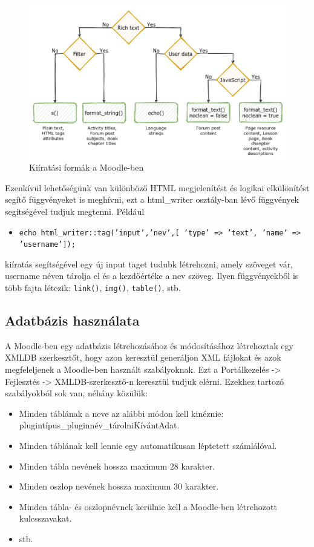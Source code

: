 \begin{figure}
    \centering
    \includegraphics[scale=0.9]{Fejezetek/Images/print.png}
    \caption{Kiíratási formák a Moodle-ben}
\end{figure}

Ezenkívül lehetőségünk van különböző HTML megjelenítést és logikai elkülönítést segítő függvényeket is meghívni, ezt a html\_writer osztály-ban lévő függvények segítségével tudjuk megtenni. Például
\begin{itemize}
    \item[] \texttt{echo html\_writer::tag('input','nev',[ 'type' => 'text', 'name' => 'username']);} 
\end{itemize}
kiíratás segítségével egy új input taget tudubk létrehozni, amely szöveget vár, username néven tárolja el és a kezdőértéke a nev szöveg. Ilyen függvényekből is több fajta létezik: \texttt{link()}, \texttt{img()}, \texttt{table()}, stb.

\subsection{Adatbázis használata}

A Moodle-ben egy adatbázis létrehozásához és módosításához létrehoztak egy XMLDB szerkesztőt, hogy azon keresztül generáljon XML fájlokat és azok megfeleljenek a Moodle-ben használt szabályoknak. Ezt a Portálkezelés -> Fejlesztés -> XMLDB-szerkesztő-n keresztül tudjuk elérni. Ezekhez tartozó szabályokból sok van, néhány közülük:

\begin{itemize}
    \item Minden táblának a neve az alábbi módon kell kinéznie: plugintípus\_pluginnév\_tárolniKívántAdat.
    \item Minden táblának kell lennie egy automatikusan léptetett számlálóval.
    \item Minden tábla nevének hossza maximum 28 karakter.
    \item Minden oszlop nevének hossza maximum 30 karakter.
    \item Minden tábla- és oszlopnévnek kerülnie kell a Moodle-ben létrehozott kulcsszavakat.
    \item stb.
\end{itemize}

